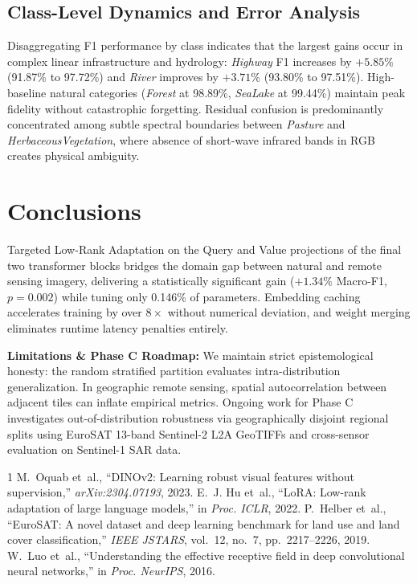 \documentclass[conference,a4paper]{IEEEtran}
\begin{document}
\subsection{Class-Level Dynamics and Error Analysis}
Disaggregating F1 performance by class indicates that the largest gains occur in complex linear infrastructure and hydrology: \textit{Highway} F1 increases by $+5.85\%$ (91.87\% to 97.72\%) and \textit{River} improves by $+3.71\%$ (93.80\% to 97.51\%). High-baseline natural categories (\textit{Forest} at 98.89\%, \textit{SeaLake} at 99.44\%) maintain peak fidelity without catastrophic forgetting. Residual confusion is predominantly concentrated among subtle spectral boundaries between \textit{Pasture} and \textit{HerbaceousVegetation}, where absence of short-wave infrared bands in RGB creates physical ambiguity.

\section{Conclusions}
Targeted Low-Rank Adaptation on the Query and Value projections of the final two transformer blocks bridges the domain gap between natural and remote sensing imagery, delivering a statistically significant gain ($+1.34\%$ Macro-F1, $p=0.002$) while tuning only 0.146\% of parameters. Embedding caching accelerates training by over $8\times$ without numerical deviation, and weight merging eliminates runtime latency penalties entirely.

\noindent \textbf{Limitations \& Phase C Roadmap:} We maintain strict epistemological honesty: the random stratified partition evaluates intra-distribution generalization. In geographic remote sensing, spatial autocorrelation between adjacent tiles can inflate empirical metrics. Ongoing work for Phase C investigates out-of-distribution robustness via geographically disjoint regional splits using EuroSAT 13-band Sentinel-2 L2A GeoTIFFs and cross-sensor evaluation on Sentinel-1 SAR data.


\begin{thebibliography}{1}
M.~Oquab et~al., ``DINOv2: Learning robust visual features without supervision,'' \emph{arXiv:2304.07193}, 2023.
E.~J. Hu et~al., ``LoRA: Low-rank adaptation of large language models,'' in \emph{Proc. ICLR}, 2022.
P.~Helber et~al., ``EuroSAT: A novel dataset and deep learning benchmark for land use and land cover classification,'' \emph{IEEE JSTARS}, vol.~12, no.~7, pp.~2217--2226, 2019.
W.~Luo et~al., ``Understanding the effective receptive field in deep convolutional neural networks,'' in \emph{Proc. NeurIPS}, 2016.
\end{thebibliography}
\end{document}
